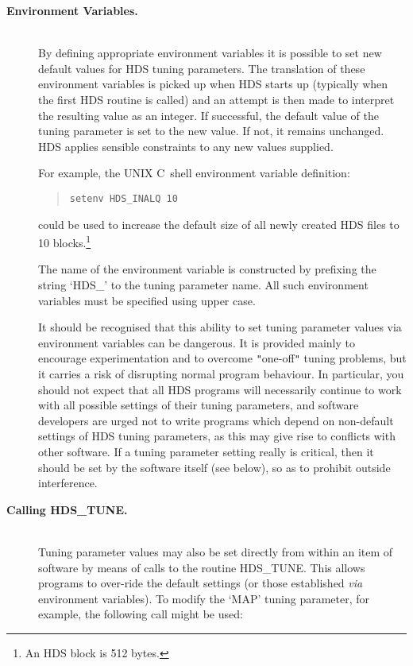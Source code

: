 \documentclass[11pt]{article}
\newcommand{\htmlref}[2]{#1}
\newcommand{\qt}[1]{``#1''}
\newcommand{\st}[1]{{\em{#1}}}
\renewcommand{\qt}[1]{{\tt{"}}#1{\tt{"}}}
\begin{document}
\begin{description}

\item[{\bf Environment Variables.}]\mbox{}\\
By defining appropriate environment variables it is possible to set
new default values for HDS tuning parameters. The translation of these
environment variables is picked up when HDS starts up (typically when
the first HDS routine is called) and an attempt is then made to
interpret the resulting value as an integer. If successful, the
default value of the tuning parameter is set to the new value. If not,
it remains unchanged. HDS applies sensible constraints to any new
values supplied.

For example, the UNIX C~shell environment variable definition:

\small
\begin{quote}
\begin{verbatim}
setenv HDS_INALQ 10
\end{verbatim}
\end{quote}
\normalsize

could be used to increase the default size of all newly created HDS
files to 10 blocks.\footnote{An HDS block is 512 bytes.}

The name of the environment variable is constructed by prefixing the
string `HDS\_' to the tuning parameter name. All such environment
variables must be specified using upper case.

It should be recognised that this ability to set tuning parameter
values via environment variables can be dangerous. It is provided
mainly to encourage experimentation and to overcome \qt{one-off}
tuning problems, but it carries a risk of disrupting normal program
behaviour. In particular, you should not expect that all HDS programs
will necessarily continue to work with all possible settings of their
tuning parameters, and software developers are urged not to write
programs which depend on non-default settings of HDS tuning
parameters, as this may give rise to conflicts with other software. If
a tuning parameter setting really is critical, then it should be set
by the software itself (see below), so as to prohibit outside
interference.

\item[{\bf Calling \htmlref{HDS\_TUNE}{HDS_TUNE}.}]\mbox{}\\
Tuning parameter values may also be set directly from within an item
of software by means of calls to the routine HDS\_TUNE. This allows
programs to over-ride the default settings (or those established
\st{via} environment variables). To modify the `MAP' tuning parameter,
for example, the following call might be used:


\end{description}
\end{document}
